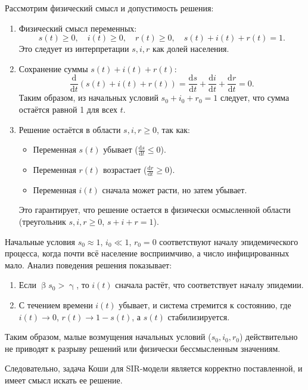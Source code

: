 \documentclass[a4paper, 14pt]{extreport}
\renewcommand{\leq}{\leqslant}
\renewcommand{\geq}{\geqslant}
\renewcommand{\beta}{\upbeta}
\renewcommand{\gamma}{\upgamma}
\begin{document}
	Рассмотрим физический смысл и допустимость решения:
	\begin{enumerate}
		\item Физический смысл переменных:
		\[
		s(t) \geq 0, \quad i(t) \geq 0, \quad r(t) \geq 0, \quad s(t) + i(t) + r(t) = 1.
		\]
		Это следует из интерпретации \( s, i, r \) как долей населения. 
		\item Сохранение суммы \( s(t) + i(t) + r(t) \):
		\[
		\frac{\mathrm{d}}{\mathrm{d}t}(s(t) + i(t) + r(t)) = \frac{\mathrm{d}s}{\mathrm{d}t} + \frac{\mathrm{d}i}{\mathrm{d}t} + \frac{\mathrm{d}r}{\mathrm{d}t} = 0.
		\]
		Таким образом, из начальных условий \( s_0 + i_0 + r_0 = 1 \) следует, что сумма остаётся равной 1 для всех \( t \).
		\item 
		Решение остаётся в области \( s, i, r \geq 0 \), так как:
		\begin{itemize}
			\item Переменная \( s(t) \) убывает (\( \frac{\mathrm{d}s}{\mathrm{d}t} \leq 0 \)).
			\item Переменная \( r(t) \) возрастает (\( \frac{\mathrm{d}r}{\mathrm{d}t} \geq 0 \)).
			\item Переменная \( i(t) \) сначала может расти, но затем убывает.
		\end{itemize}
		Это гарантирует, что решение остается в физически осмысленной области (треугольник $s,i,r \geq 0$, $s+i+r = 1$).
	\end{enumerate}
	
	Начальные условия \( s_0 \approx 1 \), \( i_0 \ll 1 \), \( r_0 = 0 \) соответствуют началу эпидемического процесса, когда почти всё население восприимчиво, а число инфицированных мало. Анализ поведения решения показывает:
	\begin{enumerate}
		\item Если \( \beta s_0 > \gamma \), то \( i(t) \) сначала растёт, что соответствует началу эпидемии.
		\item С течением времени \( i(t) \) убывает, и система стремится к состоянию, где \( i(t) \to 0 \), \( r(t) \to 1 - s(t) \), а \( s(t) \) стабилизируется.
	\end{enumerate}
		
	Таким образом, малые возмущения начальных условий (\( s_0, i_0, r_0 \)) действительно не приводят к разрыву решений или физически бессмысленным значениям.

	Следовательно, задача Коши для SIR-модели является корректно поставленной, и имеет смысл искать ее решение.
\end{document}
